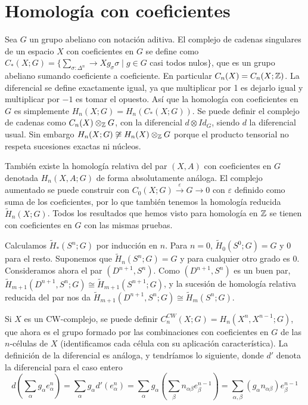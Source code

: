 \documentclass[TA.tex]{subfiles}
\begin{document}
\section{Homología con coeficientes}
Sea $G$ un grupo abeliano con notación aditiva. El complejo de cadenas singulares de un espacio $X$ con coeficientes en $G$ se define como $C_*(X;G)=\{\sum_{\sigma:\Delta^n}\to X g_{\sigma}\sigma\mid g\in G$ casi todos nulos$\}$, que es un grupo abeliano sumando coeficiente a coeficiente. En particular $C_n(X)=C_n(X;\mathbb{Z})$. La diferencial se define exactamente igual, ya que multiplicar por 1 es dejarlo igual y multiplicar por $-1$ es tomar el opuesto. Así que la homología con coeficientes en $G$ es simplemente $H_n(X;G)=H_n(C_*(X;G))$. Se puede definir el complejo de cadenas como $C_n(X)\otimes_{\mathbb{Z}}G$, con la diferencial $d\otimes Id_G$, siendo $d$ la diferencial usual. Sin embargo $H_n(X;G)\not\cong H_n(X)\otimes_{\mathbb{Z}}G$ porque el producto tensorial no respeta sucesiones exactas ni núcleos. 

 También existe la homología relativa del par $(X,A)$ con coeficientes en $G$ denotada $H_n(X,A;G)$ de forma absolutamente análoga. El complejo aumentado se puede construir con $C_0(X;G)\xrightarrow{\varepsilon}G\to 0$ con $\varepsilon$ definido como suma de los coeficientes, por lo que también tenemos la homología reducida $\widetilde{H}_n(X;G)$. Todos los resultados que hemos visto para homología en $\mathbb{Z}$ se tienen con coeficientes en $G$ con las mismas pruebas.
 
 \begin{ej}
 Calculamos $\widetilde{H}_*(S^n;G)$ por inducción en $n$. Para $n=0$, $\widetilde{H}_0(S^0;G)=G$ y 0 para el resto. Suponemos que $\widetilde{H}_n(S^n;G)=G$ y para cualquier otro grado es 0. Consideramos ahora el par $(D^{n+1}, S^n)$. Como $(D^{n+1}, S^n)$ es un buen par, $\widetilde{H}_{m+1}(D^{n+1},S^n;G)\cong \widetilde{H}_{m+1}(S^{n+1};G)$, y la sucesión de homología relativa reducida del par nos da $\widetilde{H}_{m+1}(D^{n+1},S^n;G)\cong \widetilde{H}_m(S^n;G)$. 
 \end{ej}
 Si $X$ es un CW-complejo, se puede definir $C_n^{CW}(X;G)=H_n(X^n,X^{n-1};G)$, que ahora es el grupo formado por las combinaciones con coeficientes en $G$ de las $n$-células de $X$ (identificamos cada célula con su aplicación característica). La definición de la diferencial es análoga, y tendríamos lo siguiente, donde $d'$ denota la diferencial para el caso entero
 \[
 d(\sum_\alpha g_\alpha e_{\alpha}^n)=\sum_{\alpha}g_\alpha d'(e_{\alpha}^n)=\sum_{\alpha}g_\alpha(\sum_{\beta}n_{\alpha\beta}e_{\beta}^{n-1})=\sum_{\alpha,\beta}(g_\alpha n_{\alpha\beta})e^{n-1}_{\beta}
 \]
 
\end{document}
